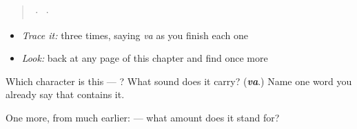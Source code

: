 \begin{quote}
  ·    ·  
\end{quote}

\begin{itemize}
\raggedright
  \item \emph{Trace it:}  three times, saying \emph{va} as you finish each one
  \item \emph{Look:} back at any page of this chapter and find  once more
\end{itemize}

\begin{tcolorbox}[breakable,colback=teal!4,colframe=teal!35!black,title={Before you move on}]
Which character is this — ? What sound does it carry? (\emph{\textbf{va}}.) Name one word you already say that contains it.

One more, from much earlier:  — what amount does it stand for?
\end{tcolorbox}
